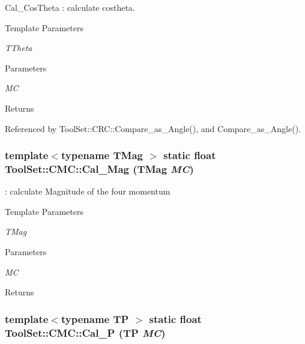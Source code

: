Cal\_\-CosTheta : calculate costheta. 
\begin{DoxyTemplParams}{Template Parameters}
\item[{\em TTheta}]\end{DoxyTemplParams}

\begin{DoxyParams}{Parameters}
\item[{\em MC}]\end{DoxyParams}
\begin{DoxyReturn}{Returns}

\end{DoxyReturn}


Referenced by ToolSet::CRC::Compare\_\-as\_\-Angle(), and Compare\_\-as\_\-Angle().\hypertarget{classToolSet_1_1CMC_acbada53a8416ca460d7aa07453610dc2}{
\subsubsection[{Cal\_\-Mag}]{\setlength{\rightskip}{0pt plus 5cm}template$<$typename TMag $>$ static float ToolSet::CMC::Cal\_\-Mag (TMag {\em MC})}}
\label{classToolSet_1_1CMC_acbada53a8416ca460d7aa07453610dc2}


: calculate Magnitude of the four momentum 
\begin{DoxyTemplParams}{Template Parameters}
\item[{\em TMag}]\end{DoxyTemplParams}

\begin{DoxyParams}{Parameters}
\item[{\em MC}]\end{DoxyParams}
\begin{DoxyReturn}{Returns}

\end{DoxyReturn}
\hypertarget{classToolSet_1_1CMC_ae7f67f1180165cedcc4cbeb4e114e5d1}{
\subsubsection[{Cal\_\-P}]{\setlength{\rightskip}{0pt plus 5cm}template$<$typename TP $>$ static float ToolSet::CMC::Cal\_\-P (TP {\em MC})}}
\label{classToolSet_1_1CMC_ae7f67f1180165cedcc4cbeb4e114e5d1}


